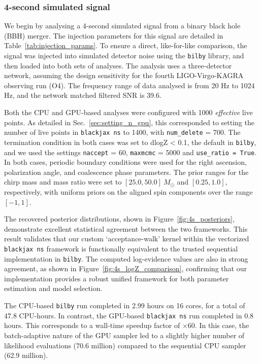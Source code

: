 \documentclass[fleqn,usenatbib]{mnras}
\begin{document}
\subsubsection{4-second simulated signal}
\label{sec:4s_simulated_signal}

We begin by analysing a 4-second simulated signal from a binary black
hole (BBH) merger. The injection parameters for this signal are
detailed in Table~\ref{tab:injection_params}. To ensure a direct,
like-for-like comparison, the signal was injected into simulated
detector noise using the \texttt{bilby} library, and 
then loaded into both sets of analyses. The analysis
uses a three-detector network, assuming the design
sensitivity for the fourth LIGO-Virgo-KAGRA observing run (O4).
The frequency range of data analysed is from 20 Hz to 1024 Hz, 
and the network matched filtered SNR is 39.6. 

Both the CPU and GPU-based analyses were configured with 1000 \textit{effective} live
points. As detailed in Sec.~\ref{sec:setting_n_gpu}, this corresponded to
setting the number of live points in \texttt{blackjax ns} to 1400, with \texttt{num\_delete} = 700.
The termination condition in both cases was set to dlogZ < 0.1, the default in \texttt{bilby},
and we used the settings \texttt{naccept} = 60, \texttt{maxmcmc} = 5000 and \texttt{use\_ratio = True}. 
In both cases, periodic boundary conditions were used for the right ascension, 
polarization angle, and coalescence phase parameters. The prior ranges
for the chirp mass and mass ratio were set to $[25.0, 50.0]~M_{\odot}$
and $[0.25, 1.0]$, respectively, with uniform priors on the aligned
spin components over the range $[-1, 1]$. 

The recovered posterior distributions, shown in
Figure~\ref{fig:4s_posteriors}, demonstrate excellent statistical
agreement between the two frameworks. This result validates that our
custom `acceptance-walk' kernel within the vectorized \texttt{blackjax ns}
framework is functionally equivalent to the trusted sequential
implementation in \texttt{bilby}. The computed log-evidence values are
also in strong agreement, as shown in Figure~\ref{fig:4s_logZ_comparison},
confirming that our implementation provides a robust unified framework for both
parameter estimation and model selection.

The CPU-based \texttt{bilby} run completed in 2.99 hours on 16 cores, for a total of
47.8 CPU-hours. In contrast, the GPU-based \texttt{blackjax ns} run
completed in 0.8 hours. This corresponds to a wall-time speedup factor
of $\times 60$. In this case, the batch-adaptive nature of the GPU
sampler led to a slightly higher number of likelihood evaluations
(70.6 million) compared to the sequential CPU sampler (62.9 million).
\end{document}
